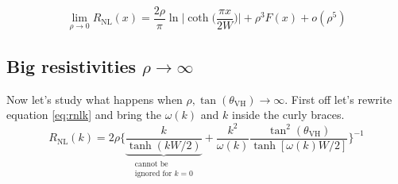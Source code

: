 \begin{equation}
    \lim_{\rho\to 0} R_{\textrm{NL}}(x)=
    \frac{2\rho}\pi\ln\bigg |\coth \Big(\frac{\pi x}{2W}\Big)\bigg | +
    \rho^3F(x) +
    o(\rho^5)
    \label{eq:lowrho}
\end{equation}




















\subsection{Big resistivities $\rho\to \infty$}
\label{sec:highrho}
Now let's study what happens when $\rho,\tan(\theta_{\textrm{VH}})\to \infty$. First off let's rewrite equation \ref{eq:rnlk} and bring the $\omega(k)$ and $k$ inside the curly braces.
\begin{equation}
        R_{\textrm{NL}}(k)=2\rho
    \bigg\{
        \underbrace{\frac{k}{\tanh(kW/2)}}_{\substack{\text{cannot be}\\\text{ignored for } k=0}} + \frac {k^2}{\omega(k)}\frac{\tan^2(\theta_{\textrm{VH}})}{\tanh[\omega(k)W/2]}    
    \bigg\}^{-1}
    \label{eq:rhoinf1}
\end{equation}


